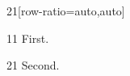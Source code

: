 \documentclass[paper=A4]{ropas-poster}
\begin{document}
\begin{postergrid}{2}{1}[row-ratio={auto,auto}]
\begin{posterblock}{1}{1}
First.
\end{posterblock}
\begin{posterblock}{2}{1}
Second.
\end{posterblock}
\end{postergrid}
\end{document}

